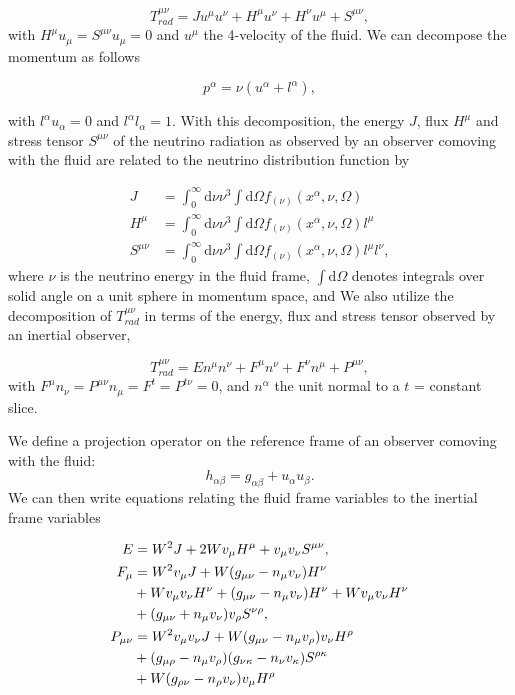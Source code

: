 \begin{equation}
T^{\mu\nu}_{rad}  = Ju^\mu u^\nu + H^\mu u^\nu + H^\nu u^\mu + S^{\mu\nu},
\end{equation}
%
with $H^\mu u_\mu = S^{\mu\nu}u_\mu = 0$ and $u^\mu$ the 4-velocity of the fluid. We can decompose the momentum as follows

\begin{equation}
  p^\alpha = \nu(u^\alpha + l^\alpha),
\end{equation}

with $l^\alpha u_\alpha = 0$ and $l^\alpha l_\alpha = 1$. With this decomposition, the energy $J$, flux $H^\mu$ and stress tensor $S^{\mu\nu}$ of the neutrino radiation as observed by an observer comoving with the fluid are related to the neutrino distribution function by

\begin{align}
  J &= \int^\infty_0 \mathrm{d}\nu \nu^3 \int \mathrm{d}\Omega f_{(\nu)}(x^{\alpha}, \nu, \Omega) \\
  H^\mu &= \int^\infty_0 \mathrm{d}\nu \nu^3 \int \mathrm{d}\Omega f_{(\nu)}(x^{\alpha}, \nu, \Omega) l^{\mu}\\
  S^{\mu\nu} &= \int^\infty_0 \mathrm{d}\nu \nu^3 \int \mathrm{d}\Omega f_{(\nu)}(x^{\alpha}, \nu, \Omega) l^{\mu}l^\nu,
\end{align}
%
where $\nu$ is the neutrino energy in the fluid frame, $\int\mathrm{d}\Omega$ denotes integrals over solid angle on a unit sphere in momentum space, and
%
%
We also utilize the decomposition of $T^{\mu\nu}_{rad}$ in terms of the energy, flux and stress tensor observed by an inertial observer,

\begin{equation}
  T^{\mu\nu}_{rad} = En^\mu n^\nu + F^\mu n^\nu + F^\nu n^\mu + P^{\mu\nu},
\end{equation}
%
with $F^\mu n_\nu = P^{\mu\nu}n_\mu = F^t = P^{t\nu} = 0$, and $n^\alpha$ the unit normal to a $t$ = constant slice.

We define a projection operator on the reference frame of an observer comoving with the fluid:
%
\begin{equation}
  h_{\alpha\beta} = g_{\alpha\beta} + u_\alpha u_\beta.
\end{equation}
%
We can then write equations relating the fluid frame variables to the inertial frame variables

\begin{align}
  E &= W^2 J + 2 W v_\mu H^\mu + v_\mu v_\nu S^{\mu\nu}, \\
  F_\mu &= W^2 v_\mu J + W(g_{\mu\nu} - n_\mu v_\nu) H^\nu \\
  &+ W v_\mu v_\nu H^\nu + (g_{\mu\nu} - n_\mu v_\nu) H^\nu + Wv_\mu v_\nu H^\nu \notag\\
  &+ (g_{\mu\nu} + n_\mu v_\nu) v_\rho S^{\nu\rho}, \notag\\
  P_{\mu\nu} &= W^2 v_\mu v_\nu J + W(g_{\mu\nu} - n_\mu v_\rho)v_\nu H^\rho \\
  &+ (g_{\mu\rho} - n_\mu v_\rho)(g_{\nu\kappa} - n_\nu v_\kappa)S^{\rho\kappa} \notag \\
  &+ W(g_{\rho\nu} - n_\rho v_\nu) v_\mu H^\rho \notag
\end{align}

